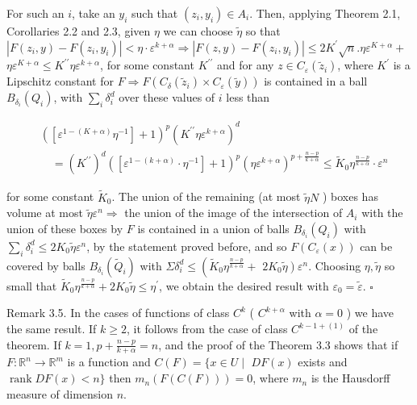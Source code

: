 \documentclass[10pt]{article}
\begin{document}
For such an $i$, take an $y_{i}$ such that $\left(z_{i}, y_{i}\right) \in A_{i}$. Then, applying Theorem 2.1, Corollaries 2.2 and 2.3, given $\eta$ we can choose $\tilde{\eta}$ so that $\left|F\left(z_{i}, y\right)-F\left(z_{i}, y_{i}\right)\right|<\eta \cdot \varepsilon^{k+\alpha} \Rightarrow\left|F(z, y)-F\left(z_{i}, y_{i}\right)\right| \leq 2 K^{\prime} \sqrt{n} . \eta \varepsilon^{K+\alpha}+$ $\eta \varepsilon^{K+\alpha} \leq K^{\prime \prime} \eta \varepsilon^{k+\alpha}$, for some constant $K^{\prime \prime}$ and for any $z \in C_{\varepsilon}\left(\widetilde{z}_{i}\right)$, where $K^{\prime}$ is a Lipschitz constant for $F \Rightarrow F\left(C_{\delta}\left(\widetilde{z}_{i}\right) \times C_{\varepsilon}(\widetilde{y})\right)$ is contained in a ball $B_{\delta_{i}}\left(Q_{i}\right)$, with $\sum_{i} \delta_{i}^{d}$ over these values of $i$ less than

$$
\begin{aligned}
& \left(\left[\varepsilon^{1-(K+\alpha)} \eta^{-1}\right]+1\right)^{p}\left(K^{\prime \prime} \eta \varepsilon^{k+\alpha}\right)^{d} \\
& \quad=\left(K^{\prime \prime}\right)^{d}\left(\left[\varepsilon^{1-(k+\alpha)} \cdot \eta^{-1}\right]+1\right)^{p}\left(\eta \varepsilon^{k+\alpha}\right)^{p+\frac{n-p}{k+\alpha}} \leq \widetilde{K}_{0} \eta^{\frac{n-p}{k+\alpha}} \cdot \varepsilon^{n}
\end{aligned}
$$

for some constant $\widetilde{K}_{0}$. The union of the remaining (at most $\tilde{\eta} N$ ) boxes has volume at most $\tilde{\eta} \varepsilon^{n} \Rightarrow$ the union of the image of the intersection of $A_{i}$ with the union of these boxes by $F$ is contained in a union of balls $B_{\delta_{i}}\left(Q_{i}\right)$ with $\sum_{i} \delta_{i}^{d} \leq 2 K_{0} \tilde{\eta} \varepsilon^{n}$, by the statement proved before, and so $F\left(C_{\varepsilon}(x)\right)$ can be covered by balls $B_{\delta_{i}}\left(\widetilde{Q}_{i}\right)$ with $\Sigma \delta_{i}^{d} \leq\left(\widetilde{K}_{0} \eta^{\frac{n-p}{k+\alpha}}+\right.$ $\left.2 K_{0} \tilde{\eta}\right) \varepsilon^{n}$. Choosing $\eta, \tilde{\eta}$ so small that $\widetilde{K}_{0} \eta^{\frac{n-p}{k+\alpha}}+2 K_{0} \tilde{\eta} \leq \eta^{\prime}$, we obtain the desired result with $\varepsilon_{0}=\tilde{\varepsilon}$. \(\square\)

Remark 3.5. In the cases of functions of class $C^{k}$ ( $C^{k+\alpha}$ with $\alpha=0$ ) we have the same result. If $k \geq 2$, it follows from the case of class $C^{k-1+(1)}$ of the theorem. If $k=1, p+\frac{n-p}{k+\alpha}=n$, and the proof of the Theorem 3.3 shows that if $F: \mathbb{R}^{n} \rightarrow \mathbb{R}^{m}$ is a function and $C(F)=\{x \in U \mid$ $D F(x)$ exists and $\operatorname{rank} D F(x)<n\}$ then $m_{n}(F(C(F)))=0$, where $m_{n}$ is the Hausdorff measure of dimension $n$.
\end{document}
